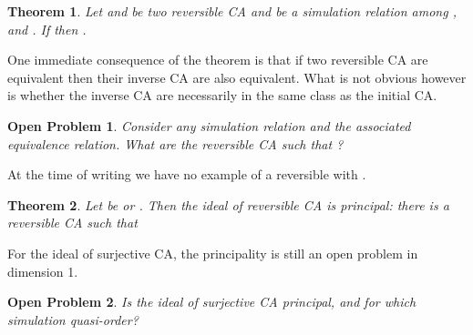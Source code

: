 \documentclass[a4paper]{elsarticle}
\def\qed{\relax\ifmmode\hskip2em \blacksquare\else\unskip\nobreak\hfill\hskip1em \fi}
\newtheorem{thm}{Theorem}[section]
\newtheorem{openpb}{Open Problem}
\begin{document}
\begin{thm}
  Let  and  be two reversible CA and  be a
  simulation relation among ,  and
  . If  then
  .
\end{thm}

One immediate consequence of the theorem is that if two reversible CA
are equivalent then their inverse CA are also equivalent. What is not
obvious however is whether the inverse CA are necessarily in the same
class as the initial CA.

\begin{openpb}
  Consider any simulation relation and  the associated equivalence
  relation.  What are the reversible CA  such that ?
\end{openpb}

At the time of writing we have no example of a reversible  with
. 

\begin{thm}
  \label{thm:revuniv}
  Let  be  or . Then the ideal of
  reversible CA is principal: there is a reversible CA  such
  that
  
\end{thm}

For the ideal of surjective CA, the principality is still an open
problem in dimension 1.

\begin{openpb}
  \label{open:surjideal}
  Is the ideal of surjective CA principal, and for which simulation
  quasi-order?
\end{openpb}
\end{document}
